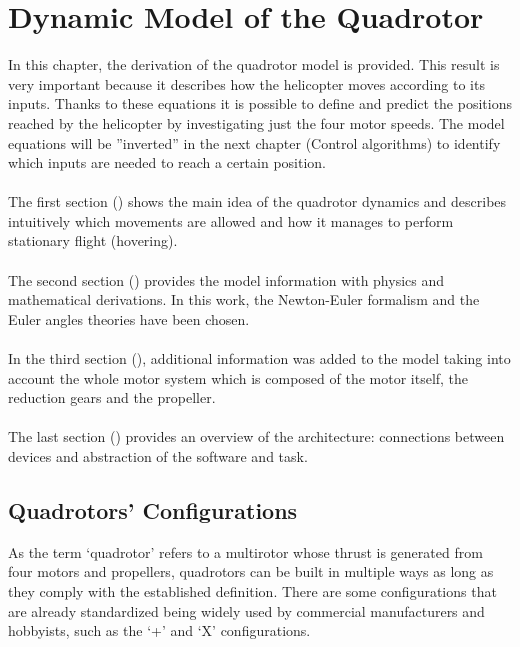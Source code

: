 \chapter{Dynamic Model of the Quadrotor \label{ch:model}}

In this chapter, the derivation of the quadrotor model is provided. This result
is very important because it describes how the helicopter moves according to its
inputs. Thanks to these equations it is possible to define and predict the positions
reached by the helicopter by investigating just the four motor speeds. The model
equations will be ”inverted” in the next chapter (Control algorithms) to identify
which inputs are needed to reach a certain position.
\\\\
The first section () shows the main idea of the quadrotor
dynamics and describes intuitively which movements are allowed and how it
manages to perform stationary flight (hovering).
\\\\
The second section () provides the model information
with physics and mathematical derivations. In this work, the Newton-Euler
formalism and the Euler angles theories have been chosen.
\\\\
In the third section (), additional information was added to
the model taking into account the whole motor system which is composed of the
motor itself, the reduction gears and the propeller.
\\\\
The last section () provides an overview of the architecture:
connections between devices and abstraction of the software and task.

\section{Quadrotors' Configurations}
\label{sec:configurations}
As the term `quadrotor' refers to a multirotor whose thrust is generated from four motors and propellers, quadrotors can be built in multiple ways as long as they comply with the established definition. There are some configurations that are already standardized being widely used by commercial manufacturers and hobbyists, such as the `+' and `X' configurations.


